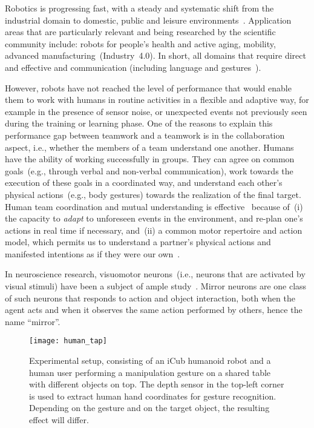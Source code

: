 Robotics is progressing fast, with a steady and systematic shift from the industrial domain to domestic, public and leisure environments~\cite[ch.~65, Domestic Robotics]{siciliano:2016:handbook2}. Application areas that are particularly relevant and being researched by the scientific community include: robots for people's health and active aging, mobility, advanced manufacturing~(Industry~4.0). In short, all domains that require direct and effective \hri{} and communication (including language and gestures~\cite{matuszek:2014:aaai}).

However, robots have not reached the level of performance that would enable them to work with humans in routine activities in a flexible and adaptive way, for example in the presence of sensor noise, or unexpected events not previously seen during the training or learning phase. One of the reasons to explain this performance gap between \hh{} teamwork and a \hr{} teamwork is in the collaboration aspect, i.e., whether the members of a team understand one another. Humans have the ability of working successfully in groups. They can agree on common goals~(e.g., through verbal and non-verbal communication), work towards the execution of these goals in a coordinated way, and understand each other's physical actions~(e.g., body gestures) towards the realization of the final target. Human team coordination and mutual understanding is effective~\cite{ramnani:2004:natureneuro} because of~(i) the capacity to \emph{adapt} to unforeseen events in the environment, and re-plan one's actions in real time if necessary, and~(ii) a common motor repertoire and action model, which permits us to understand a partner's physical actions and manifested intentions as if they were our own~\cite{saponaro:2013:crhri}.

In neuroscience research, visuomotor neurons~(i.e., neurons that are activated by visual stimuli) have been a subject of ample study~\cite{rizzolatti:2001:nrn}. Mirror neurons are one class of such neurons that responds to action and object interaction, both when the agent acts and when it observes the same action performed by others, hence the name ``mirror''.

\begin{figure}
  \centering
  \texttt{[image: human\_tap]}
  \caption{Experimental setup, consisting of an iCub humanoid robot and a human user performing a manipulation gesture on a shared table with different objects on top. The depth sensor in the top-left corner is used to extract human hand coordinates for gesture recognition. Depending on the gesture and on the target object, the resulting effect will differ.}
  \label{fig:experimental_setup}
\end{figure}

